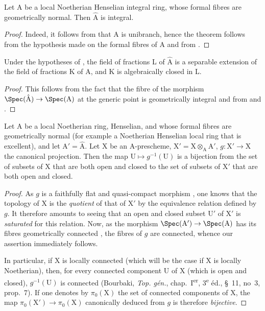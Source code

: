 \begin{corollary}[18.9.2]
\label{IV.18.9.2}
Let $\mathrm{A}$ be a local Noetherian Henselian integral ring, whose formal fibres are geometrically normal.
Then $\hat{\mathrm{A}}$ is integral.
\end{corollary}

\begin{proof}
Indeed, it follows from  that A is unibranch, hence the theorem follows from the hypothesis made on the formal fibres of A and from .
\end{proof}

\begin{corollary}[18.9.3]
\label{IV.18.9.3}
Under the hypotheses of , the field of fractions L of $\hat{\mathrm{A}}$ is a separable extension of the field of fractions K of A, and K is algebraically closed in L.
\end{corollary}

\begin{proof}
This follows from the fact that the fibre of the morphism $\Spec(\hat{\mathrm{A}})\to\Spec(\mathrm{A})$ at the generic point is geometrically integral and from  and .
\end{proof}

\begin{corollary}[18.9.4]
\label{IV.18.9.4}
Let $\mathrm{A}$ be a local Noetherian ring, Henselian, and whose formal fibres are geometrically normal (for example a Noetherian Henselian local ring that is excellent), and let $\mathrm{A}'=\hat{\mathrm{A}}$.
Let $\mathrm{X}$ be an A-prescheme, $\mathrm{X}'=\mathrm{X}\otimes_{\mathrm{A}}\mathrm{A}'$, $g:\mathrm{X}'\to\mathrm{X}$ the canonical projection.
Then the map $\mathrm{U}\mapsto g^{-1}(\mathrm{U})$ is a bijection from the set of subsets of $\mathrm{X}$ that are both open and closed to the set of subsets of $\mathrm{X}'$ that are both open and closed.
\end{corollary}

\begin{proof}
As $g$ is a faithfully flat and quasi-compact morphism , one knows that the topology of X is the \emph{quotient} of that of $\mathrm{X}'$ by the equivalence relation defined by $g$.
It therefore amounts to seeing that an open and closed subset $\mathrm{U}'$ of $\mathrm{X}'$ is \emph{saturated} for this relation.
Now, as the morphism $\Spec(\mathrm{A}')\to\Spec(\mathrm{A})$ has its fibres geometrically connected , the fibres of $g$ are connected, whence our assertion immediately follows.

In particular, if X is locally connected (which will be the case if X is locally Noetherian), then, for every connected component U of X (which is open and closed), $g^{-1}(\mathrm{U})$ is connected (Bourbaki, \emph{Top. g\'{e}n.}, chap.~I\textsuperscript{er}, 3\textsuperscript{e} \'{e}d., \S~11, no~3, prop.~7).
If one denotes by $\pi_0(\mathrm{X})$ the set of connected components of X, the map $\pi_0(\mathrm{X}')\to\pi_0(\mathrm{X})$ canonically deduced from $g$ is therefore \emph{bijective}.
\end{proof}

